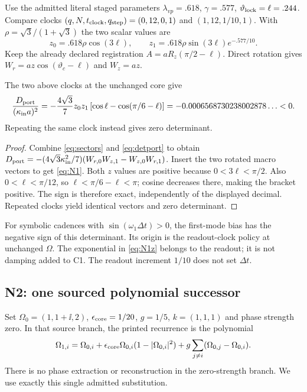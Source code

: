 Use the admitted literal staged parameters $\lambda_{vp}=.618$, $\gamma=.577$, $\vartheta_{\rm lock}=\ell=.244$. Compare clocks
$(q,N,t_{\rm clock},q_{\rm step})=(0,12,0,1)$ and $(1,12,1/10,1)$.
With $\rho=\sqrt3/(1+\sqrt3)$ the two scalar values are
\begin{equation}\label{eq:N1z}
 z_0=.618\rho\cos(3\ell),\qquad
 z_1=.618\rho\sin(3\ell)e^{-.577/10}.
\end{equation}
Keep the already declared registration $A=aR_z(\pi/2-\ell)$. Direct rotation gives $W_r=az\cos(\vartheta_c-\ell)$ and $W_z=az$.

\begin{proposition}\label{prop:N1}
The two above clocks at the unchanged core give
\begin{equation}\label{eq:N1}
 \frac{D_{\rm port}}{(\kappa_{\rm in}a)^2}
 =-\frac{4\sqrt3}{7}z_0z_1\left[\cos\ell-\cos(\pi/6-\ell)\right]
 =-0.0006568730238002878\ldots<0.
\end{equation}
Repeating the same clock instead gives zero determinant.
\end{proposition}
\begin{proof}
Combine \eqref{eq:sectors} and \eqref{eq:detport} to obtain
$D_{\rm port}=-(4\sqrt3\kappa_{\rm in}^2/7)(W_{r,0}W_{z,1}-W_{z,0}W_{r,1})$.
Insert the two rotated macro vectors to get \eqref{eq:N1}. Both $z$ values are positive because $0<3\ell<\pi/2$. Also $0<\ell<\pi/12$, so $\ell<\pi/6-\ell<\pi$; cosine decreases there, making the bracket positive. The sign is therefore exact, independently of the displayed decimal. Repeated clocks yield identical vectors and zero determinant.
\end{proof}

For symbolic cadences with $\sin(\omega_1\Delta t)>0$, the first-mode bias has the negative sign of this determinant. Its origin is the readout-clock policy at unchanged $\Omega$. The exponential in \eqref{eq:N1z} belongs to the readout; it is not damping added to C1. The readout increment $1/10$ does not set $\Delta t$.

\subsection{N2: one sourced polynomial successor}
Set $\Omega_0=(1,1+\ii,2)$, $\epsilon_{\rm core}=1/20$, $g=1/5$, $k=(1,1,1)$ and phase strength zero. In that source branch, the printed recurrence is the polynomial
\begin{equation}\label{eq:nativepoly}
 \Omega_{1,i}=\Omega_{0,i}+\epsilon_{\rm core}\Omega_{0,i}(1-|\Omega_{0,i}|^2)
 +g\sum_{j\ne i}(\Omega_{0,j}-\Omega_{0,i}).
\end{equation}
There is no phase extraction or reconstruction in the zero-strength branch. We use exactly this single admitted substitution.

